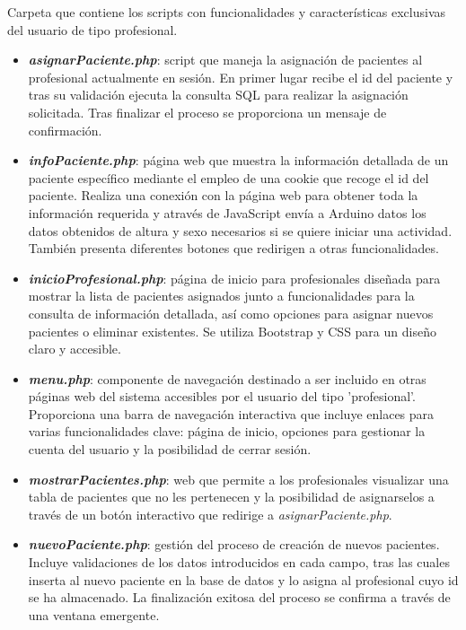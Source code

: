 \begin{itemize}
\begin{itemize}
        Carpeta que contiene los scripts con funcionalidades y características exclusivas del usuario de tipo profesional.
        \begin{itemize}
            \item \textbf{\textit{asignarPaciente.php}}: script que maneja la asignación de pacientes al profesional actualmente en sesión. En primer lugar recibe el id del paciente y tras su validación ejecuta la consulta SQL para realizar la asignación solicitada. Tras finalizar el proceso se proporciona un mensaje de confirmación.
            \item \textbf{\textit{infoPaciente.php}}: página web que muestra la información detallada de un paciente específico mediante el empleo de una cookie que recoge el id del paciente. Realiza una conexión con la página web para obtener toda la información requerida y através de JavaScript envía a Arduino datos los datos obtenidos de altura y sexo necesarios si se quiere iniciar una actividad. También presenta diferentes botones que redirigen a otras funcionalidades.
            \item \textbf{\textit{inicioProfesional.php}}: página de inicio para profesionales diseñada para mostrar la lista de pacientes asignados junto a funcionalidades para la consulta de información detallada, así como opciones para asignar nuevos pacientes o eliminar existentes. Se utiliza Bootstrap y CSS para un diseño claro y accesible.
            \item \textbf{\textit{menu.php}}: componente de navegación destinado a ser incluido en otras páginas web del sistema accesibles por el usuario del tipo 'profesional'. Proporciona una barra de navegación interactiva que incluye enlaces para varias funcionalidades clave: página de inicio, opciones para gestionar la cuenta del usuario y la posibilidad de cerrar sesión.
            \item \textbf{\textit{mostrarPacientes.php}}: web que permite a los profesionales visualizar una tabla de pacientes que no les pertenecen y la posibilidad de asignarselos a través de un botón interactivo que redirige a \textit{asignarPaciente.php}.
            \item \textbf{\textit{nuevoPaciente.php}}: gestión del proceso de creación de nuevos pacientes. Incluye validaciones de los datos introducidos en cada campo, tras las cuales inserta al nuevo paciente en la base de datos y lo asigna al profesional cuyo id se ha almacenado. La finalización exitosa del proceso se confirma a través de una ventana emergente.

\end{itemize}
\end{itemize}
\end{itemize}
